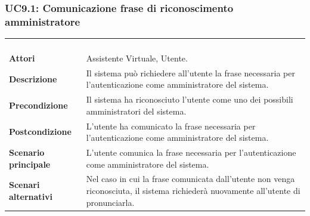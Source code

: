 \subsubsection{UC9.1: Comunicazione frase di riconoscimento amministratore}
\label{UC9.1}
\begin{longtable}{l|p{10cm}}
\rowcolor[gray]{0.8} \multicolumn{2}{c}{} \\
\rowcolor[gray]{0.8} \multicolumn{2}{c}{\textbf{UC9.1 - Comunicazione frase di riconoscimento amministratore}} \\
\rowcolor[gray]{0.8} \multicolumn{2}{c}{} \\
\hline
&\\
\textbf{Attori} & Assistente Virtuale, Utente.\\[7pt]
\textbf{Descrizione} & Il sistema può richiedere all'utente la frase necessaria per l'autenticazione come amministratore del sistema. \\[7pt]
\textbf{Precondizione} & Il sistema ha riconosciuto l'utente come uno dei possibili amministratori del sistema.\\[7pt]
\textbf{Postcondizione} & L'utente ha comunicato la frase necessaria per l'autenticazione come amministratore del sistema.\\[7pt]
\textbf{Scenario principale} &L'utente comunica la frase necessaria per l'autenticazione come amministratore del sistema. \\[7pt]
\textbf{Scenari alternativi} & Nel caso in cui la frase comunicata dall'utente non venga riconosciuta, il sistema richiederà nuovamente all'utente di pronunciarla.\\[7pt]\hline
\end{longtable}

